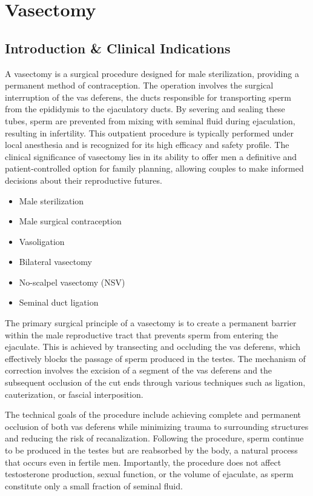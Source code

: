 \chapter{Vasectomy}

\section*{Introduction \& Clinical Indications}
A vasectomy is a surgical procedure designed for male sterilization, providing a permanent method of contraception. The operation involves the surgical interruption of the vas deferens, the ducts responsible for transporting sperm from the epididymis to the ejaculatory ducts. By severing and sealing these tubes, sperm are prevented from mixing with seminal fluid during ejaculation, resulting in infertility. This outpatient procedure is typically performed under local anesthesia and is recognized for its high efficacy and safety profile. The clinical significance of vasectomy lies in its ability to offer men a definitive and patient-controlled option for family planning, allowing couples to make informed decisions about their reproductive futures.

\begin{itemize}
  \item Male sterilization
  \item Male surgical contraception
  \item Vasoligation
  \item Bilateral vasectomy
  \item No-scalpel vasectomy (NSV)
  \item Seminal duct ligation
\end{itemize}

The primary surgical principle of a vasectomy is to create a permanent barrier within the male reproductive tract that prevents sperm from entering the ejaculate. This is achieved by transecting and occluding the vas deferens, which effectively blocks the passage of sperm produced in the testes. The mechanism of correction involves the excision of a segment of the vas deferens and the subsequent occlusion of the cut ends through various techniques such as ligation, cauterization, or fascial interposition.

The technical goals of the procedure include achieving complete and permanent occlusion of both vas deferens while minimizing trauma to surrounding structures and reducing the risk of recanalization. Following the procedure, sperm continue to be produced in the testes but are reabsorbed by the body, a natural process that occurs even in fertile men. Importantly, the procedure does not affect testosterone production, sexual function, or the volume of ejaculate, as sperm constitute only a small fraction of seminal fluid.


